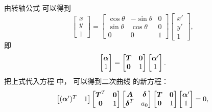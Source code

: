 由转轴公式 
可以得到\begin{equation*}
	\begin{bmatrix}
		x \\ y \\ 1
	\end{bmatrix}
	= \begin{bmatrix}
		\cos\theta & -\sin\theta & 0 \\
		\sin\theta & \cos\theta & 0 \\
		0 & 0 & 1
	\end{bmatrix}
	\begin{bmatrix}
		x' \\ y' \\ 1
	\end{bmatrix},
\end{equation*}
即\begin{equation*}
	\begin{bmatrix}
		\boldsymbol\alpha \\ 1
	\end{bmatrix}
	= \begin{bmatrix}
		\boldsymbol{T} & \boldsymbol0 \\
		\boldsymbol0 & 1
	\end{bmatrix}
	\begin{bmatrix}
		\boldsymbol\alpha' \\ 1
	\end{bmatrix}.
\end{equation*}
把上式代入方程  中，
可以得到二次曲线  的新方程：
\begin{equation}
	\begin{bmatrix}
		(\boldsymbol\alpha')^T & 1
	\end{bmatrix}
	\begin{bmatrix}
		\boldsymbol{T}^T & \boldsymbol0 \\
		\boldsymbol0 & 1
	\end{bmatrix}
	\begin{bmatrix}
		\boldsymbol{A} & \boldsymbol\delta \\
		\boldsymbol\delta^T & a_0
	\end{bmatrix}
	\begin{bmatrix}
		\boldsymbol{T} & \boldsymbol0 \\
		\boldsymbol0 & 1
	\end{bmatrix}
	\begin{bmatrix}
		\boldsymbol\alpha' \\ 1
	\end{bmatrix}
	= 0,
\end{equation}
